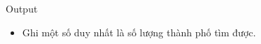 Output  
\begin{itemize}
	\item     Ghi một số duy nhất là số lượng thành phố tìm được.   
\end{itemize}